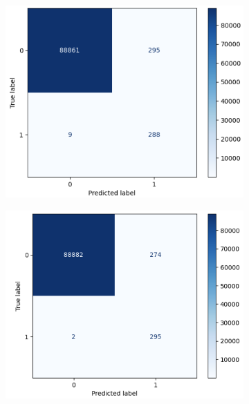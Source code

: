\documentclass{article}
\begin{document}
\begin{figure}[ht]
    \begin{subfigure}[b]{0.36\textwidth}
        \includegraphics[width=\textwidth]{weighted-xgboost-cm.png}
        \caption{}
        \label{fig:fig15}
    \end{subfigure}
    \begin{subfigure}[b]{0.36\textwidth}
        \includegraphics[width=\textwidth]{xgboost-smote-cm.png}
        \caption{}
        \label{fig:fig16}
    \end{subfigure}
\end{figure}
\end{document}
